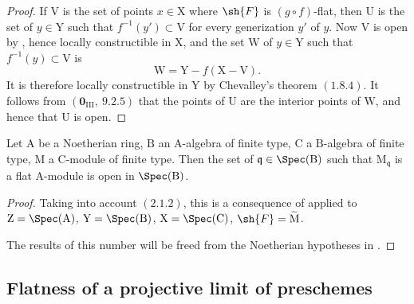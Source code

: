 \begin{proof}
If $\mathrm{V}$ is the set of points $x\in\mathrm{X}$ where $\sh{F}$ is
$(g\circ f)$-flat, then $\mathrm{U}$ is the set of $y\in\mathrm{Y}$ such
that $f^{-1}(y')\subset\mathrm{V}$ for every generization $y'$ of $y$.
Now $\mathrm{V}$ is open by , hence locally
constructible in $\mathrm{X}$, and the set $\mathrm{W}$ of
$y\in\mathrm{Y}$ such that $f^{-1}(y)\subset\mathrm{V}$ is
\[
  \mathrm{W}=\mathrm{Y}-f(\mathrm{X}-\mathrm{V}).
\]
It is therefore locally constructible in $\mathrm{Y}$ by Chevalley's
theorem $(1.8.4)$. It follows from
$(\mathbf{0}_{\mathrm{III}},~9.2.5)$ that the points of $\mathrm{U}$ are
the interior points of $\mathrm{W}$, and hence that $\mathrm{U}$ is open.
\end{proof}

\begin{corollary}[11.1.6]
\label{IV.11.1.6}
Let $\mathrm{A}$ be a Noetherian ring, $\mathrm{B}$ an $\mathrm{A}$-algebra of finite type, $\mathrm{C}$ a $\mathrm{B}$-algebra of finite type, $\mathrm{M}$ a $\mathrm{C}$-module of finite type. Then the set of $\mathfrak{q}\in\Spec(\mathrm{B})$ such that $\mathrm{M}_\mathfrak{q}$ is a flat $\mathrm{A}$-module is open in $\Spec(\mathrm{B})$.
\end{corollary}

\begin{proof}
Taking into account $(2.1.2)$, this is a consequence of  applied to $\mathrm{Z}=\Spec(\mathrm{A})$, $\mathrm{Y}=\Spec(\mathrm{B})$, $\mathrm{X}=\Spec(\mathrm{C})$, $\sh{F}=\widetilde{\mathrm{M}}$.

The results of this number will be freed from the Noetherian hypotheses in .
\end{proof}

\subsection{Flatness of a projective limit of preschemes}
\label{subsection:IV.11.2}


